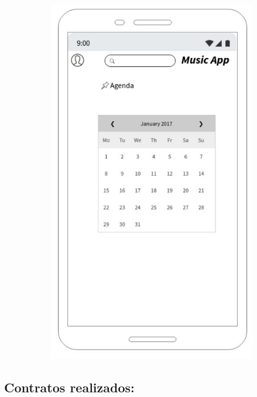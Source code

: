 \begin{figure}[hbt!]
 \centering
\includegraphics[width=12cm, height=16cm,keepaspectratio=true]{Desarrollo/Interfaces/Mockup/imgs/wire5.JPG}
\end{figure}
\newpage
\subsection{Contratos realizados:}

